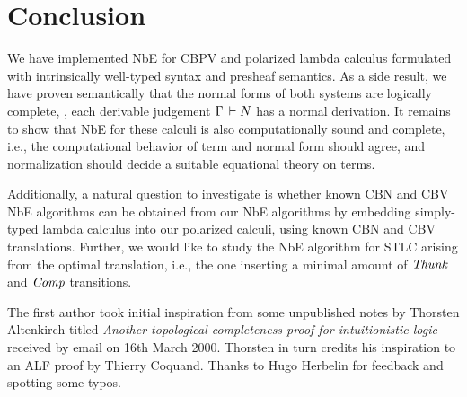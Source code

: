 \documentclass[sigplan,screen,fleqn]{acmart}
\begin{document}
\section{Conclusion}
\label{sec:concl}

We have implemented NbE for CBPV and polarized lambda calculus
formulated with intrinsically well-typed syntax and presheaf
semantics.  As a side result, we have proven semantically
that the normal forms of both systems are logically complete, \ie,
each derivable judgement $\Gamma \,\vdash N$ has a normal derivation.
It remains to show that NbE for these calculi is also computationally
sound and complete, i.e., the computational behavior of term and
normal form should agree, and normalization should decide a suitable
equational theory on terms.

Additionally, a natural question to investigate is whether known CBN
and CBV NbE algorithms can be obtained from our NbE algorithms by
embedding simply-typed lambda calculus into our polarized calculi,
using known CBN and CBV translations.  Further, we would like to study
the NbE algorithm for STLC arising from the optimal translation, i.e.,
the one inserting a minimal amount of $\mathit{Thunk}$ and $\mathit{Comp}$ transitions.


\begin{acks}
The first author took initial inspiration from some
  unpublished notes by Thorsten Altenkirch titled
\emph{Another topological completeness proof for intuitionistic logic}
received by email on 16th March 2000.
Thorsten in turn credits his inspiration to an ALF proof by Thierry
Coquand.  Thanks to Hugo Herbelin for feedback and spotting some typos.
\end{acks}




\end{document}
